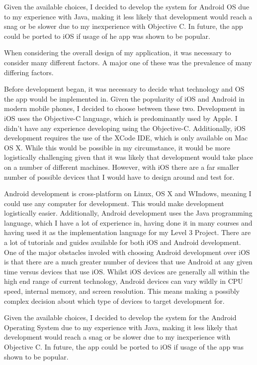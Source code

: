 \documentclass{l4proj}
\begin{document}
Given the available choices, I decided to develop the system for Android OS due to my experience with Java, making it less likely that development would reach a snag or be slower due to my inexperience with Objective C. In future, the app could be ported to iOS if usage of he app was shown to be popular.

When considering the overall design of my application, it was necessary to consider many different factors. A major one of these was the prevalence of many differing factors.

Before development began, it was necessary to decide what technology and OS the app would be implemented in. Given the popularity of iOS and Android in modern mobile phones, I decided to choose between these two. Development in iOS uses the Objective-C language, which is predominantly used by Apple. I didn’t have any experience developing using the Objective-C. Additionally, iOS development requires the use of the XCode IDE, which is only available on Mac OS X.  While this would be possible in my circumstance, it would be more logistically challenging given that it was likely that development would take place on a number of different machines. However, with iOS there are a far smaller number of possible devices that I would have to design around and test for.

Android development is cross-platform on Linux, OS X and WIndows, meaning I could use any computer for development. This would make development logistically easier. Additionally, Android development uses the Java programming language, which I have a lot of experience in, having done it in many courses and having used it as the implementation language for my Level 3 Project. There are a lot of tutorials and guides available for both iOS and Android development. One of the major obstacles involed with choosing Android development over iOS is that there are a much greater number of devices that use Android at any given time versus devices that use iOS. Whilst iOS devices are generally all within the high end range of current technology, Android devices can vary wildly in CPU speed, internal memory, and screen resolution. This means making a possibly complex decision about which type of devices to target development for.

Given the available choices, I decided to develop the system for the Android Operating System due to my experience with Java, making it less likely that development would reach a snag or be slower due to my inexperience with Objective C. In future, the app could be ported to iOS if usage of the app was shown to be popular.
\end{document}
